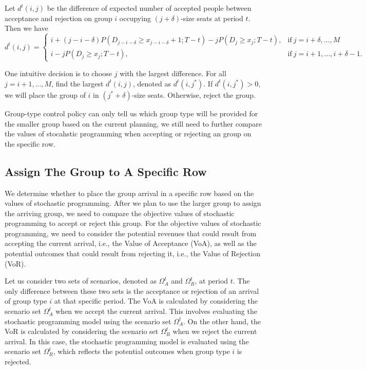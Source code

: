 Let $d^{t}(i,j)$ be the difference of expected number of accepted people between acceptance and rejection on group $i$ occupying $(j+\delta)$-size seats at period $t$. Then we have
\begin{equation*}
	d^{t}(i,j) = \begin{cases}
    i + (j-i-\delta)P(D_{j-i-\delta} \geq x_{j-i-\delta}+1; T-t) - j P(D_{j} \geq x_{j}; T-t), &\text{if}~ j = i+\delta, \ldots, M \\
    i - j P(D_{j} \geq x_{j}; T-t), &\text{if}~ j = i+1, \ldots, i+\delta-1.
		\end{cases}
\end{equation*}



One intuitive decision is to choose $j$ with the largest difference. For all $j = i+1, \ldots, M$, find the largest $d^{t}(i,j)$, denoted as $d^{t}(i,j^{*})$. If $d^{t}(i,j^{*}) >0$, we will place the group of $i$ in $(j^{*}+\delta)$-size seats. Otherwise, reject the group.

Group-type control policy can only tell us which group type will be provided for the smaller group based on the current planning, we still need to further compare the values of stocahstic programming when accepting or rejecting an group on the specific row. 


\subsection{Assign The Group to A Specific Row}
We determine whether to place the group arrival in a specific row based on the values of stochastic programming. After we plan to use the larger group to assign the arriving group, we need to compare the objective values of stochastic programming to accept or reject this group. For the objective values of stochastic programming, we need to consider the potential revenues that could result from accepting the current arrival, i.e., the Value of Acceptance (VoA), as well as the potential outcomes that could result from rejecting it, i.e., the Value of Rejection (VoR).

Let us consider two sets of scenarios, denoted as $\Omega^{t}_{A}$ and $\Omega^{t}_{R}$, at period $t$. The only difference between these two sets is the acceptance or rejection of an arrival of group type $i$ at that specific period. The VoA is calculated by considering the scenario set $\Omega^{t}_{A}$ when we accept the current arrival. This involves evaluating the stochastic programming model using the scenario set $\Omega^{t}_{A}$. On the other hand, the VoR is calculated by considering the scenario set $\Omega^{t}_{R}$ when we reject the current arrival. In this case, the stochastic programming model is evaluated using the scenario set $\Omega^{t}_{R}$, which reflects the potential outcomes when group type $i$ is rejected.

